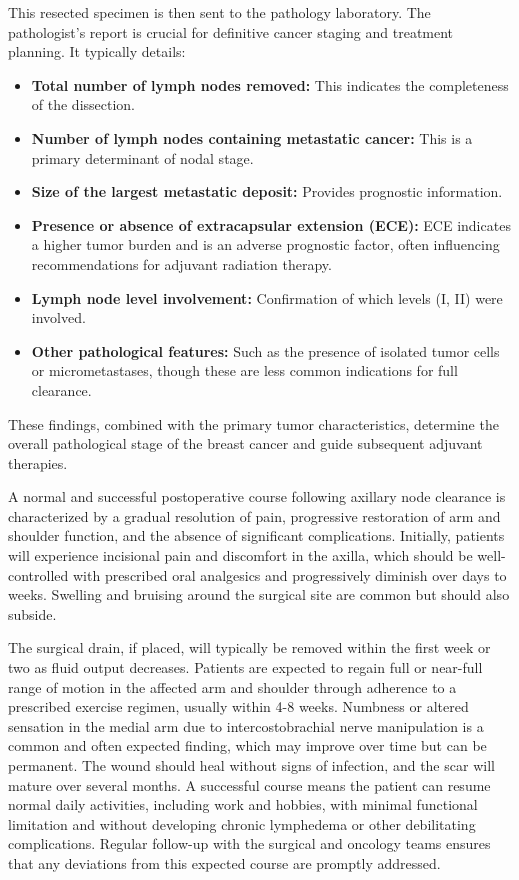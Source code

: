 This resected specimen is then sent to the pathology laboratory. The pathologist's report is crucial for definitive cancer staging and treatment planning. It typically details:
\begin{itemize}
  \item \textbf{Total number of lymph nodes removed:} This indicates the completeness of the dissection.
  \item \textbf{Number of lymph nodes containing metastatic cancer:} This is a primary determinant of nodal stage.
  \item \textbf{Size of the largest metastatic deposit:} Provides prognostic information.
  \item \textbf{Presence or absence of extracapsular extension (ECE):} ECE indicates a higher tumor burden and is an adverse prognostic factor, often influencing recommendations for adjuvant radiation therapy.
  \item \textbf{Lymph node level involvement:} Confirmation of which levels (I, II) were involved.
  \item \textbf{Other pathological features:} Such as the presence of isolated tumor cells or micrometastases, though these are less common indications for full clearance.
\end{itemize}
These findings, combined with the primary tumor characteristics, determine the overall pathological stage of the breast cancer and guide subsequent adjuvant therapies.

A normal and successful postoperative course following axillary node clearance is characterized by a gradual resolution of pain, progressive restoration of arm and shoulder function, and the absence of significant complications. Initially, patients will experience incisional pain and discomfort in the axilla, which should be well-controlled with prescribed oral analgesics and progressively diminish over days to weeks. Swelling and bruising around the surgical site are common but should also subside.

The surgical drain, if placed, will typically be removed within the first week or two as fluid output decreases. Patients are expected to regain full or near-full range of motion in the affected arm and shoulder through adherence to a prescribed exercise regimen, usually within 4-8 weeks. Numbness or altered sensation in the medial arm due to intercostobrachial nerve manipulation is a common and often expected finding, which may improve over time but can be permanent. The wound should heal without signs of infection, and the scar will mature over several months. A successful course means the patient can resume normal daily activities, including work and hobbies, with minimal functional limitation and without developing chronic lymphedema or other debilitating complications. Regular follow-up with the surgical and oncology teams ensures that any deviations from this expected course are promptly addressed.

